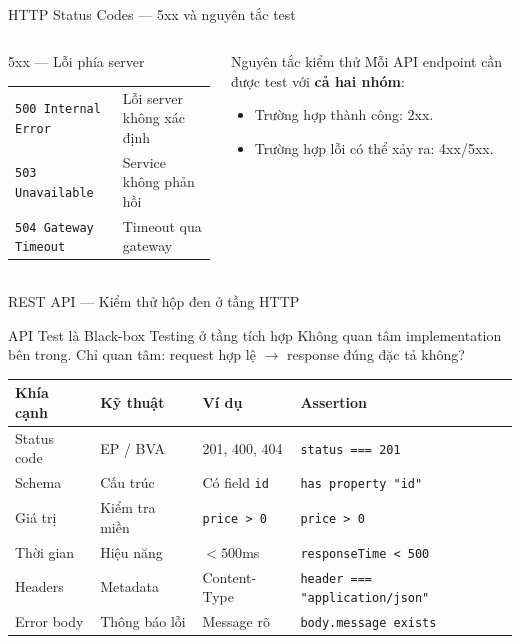 \documentclass[aspectratio=169,10pt]{beamer}
\newcommand{\sref}[1]{\textsuperscript{\scriptsize\cite{#1}}}
\begin{document}
\begin{frame}{HTTP Status Codes --- 5xx và nguyên tắc test\sref{rfc9110}}
  \begin{columns}[T]
    \begin{block}{5xx --- Lỗi phía server}
      \small
      \begin{tabular}{p{2.55cm}p{2.8cm}}
        \texttt{500 Internal Error} & Lỗi server không xác định \\
        \texttt{503 Unavailable} & Service không phản hồi \\
        \texttt{504 Gateway Timeout} & Timeout qua gateway \\
      \end{tabular}
    \end{block}

    \begin{alertblock}{Nguyên tắc kiểm thử}
      Mỗi API endpoint cần được test với \textbf{cả hai nhóm}:
      \begin{itemize}
        \item Trường hợp thành công: 2xx.
        \item Trường hợp lỗi có thể xảy ra: 4xx/5xx.
      \end{itemize}
    \end{alertblock}
  \end{columns}
\end{frame}

\begin{frame}{REST API --- Kiểm thử hộp đen ở tầng HTTP\sref{istqb}}
  \begin{block}{API Test là Black-box Testing ở tầng tích hợp}
    Không quan tâm implementation bên trong. Chỉ quan tâm:
    request hợp lệ $\to$ response đúng đặc tả không?
  \end{block}

  \vspace{0.2em}
  \begin{center}
  \scriptsize
  \setlength{\tabcolsep}{3pt}
  \begin{tabular}{p{2.4cm}p{2.1cm}p{2.7cm}p{3.2cm}}
    \toprule
    \textbf{Khía cạnh} & \textbf{Kỹ thuật} & \textbf{Ví dụ} & \textbf{Assertion} \\
    \midrule
    Status code & EP / BVA & 201, 400, 404 & \texttt{status === 201} \\
    Schema & Cấu trúc & Có field \texttt{id} & \texttt{has property "id"} \\
    Giá trị & Kiểm tra miền & \texttt{price > 0} & \texttt{price > 0} \\
    Thời gian & Hiệu năng & $< 500$ms & \texttt{responseTime < 500} \\
    Headers & Metadata & Content-Type & \texttt{header === "application/json"} \\
    Error body & Thông báo lỗi & Message rõ & \texttt{body.message exists} \\
    \bottomrule
  \end{tabular}
  \end{center}
\end{frame}
\end{document}

